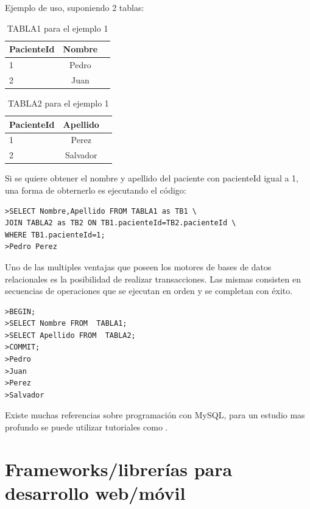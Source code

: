 Ejemplo de uso, suponiendo 2 tablas:

\begin{table}[h]
	\centering
	\caption[Tabla 1 Ejemplo SQL]{TABLA1 para el ejemplo 1}
	\begin{tabular}{l c c}    
		\toprule
		\textbf{PacienteId}     & \textbf{Nombre} \\
		\midrule
		 1& Pedro    \\		
 		 2& Juan    \\				
		\bottomrule
		\hline
	\end{tabular}
	\label{tab:Ejemplo 1}
\end{table}
\pagebreak
\begin{table}[h]
	\centering
	\caption[Tabla 2 Ejemplo SQL]{TABLA2 para el ejemplo 1}
	\begin{tabular}{l c c}    
		\toprule
		\textbf{PacienteId}     & \textbf{Apellido} \\
		\midrule
		 1& Perez    \\		
 		 2& Salvador    \\	
		\bottomrule
		\hline
	\end{tabular}
	\label{tab:Ejemplo 2}
\end{table}

Si se quiere obtener el nombre y apellido del paciente con pacienteId igual a 1, una forma de obternerlo es ejecutando el código:

\begin{lstlisting}[label=código:SQL:vControl,caption=Ejecución de comando sql]  
>SELECT Nombre,Apellido FROM TABLA1 as TB1 \
JOIN TABLA2 as TB2 ON TB1.pacienteId=TB2.pacienteId \
WHERE TB1.pacienteId=1;
>Pedro Perez
\end{lstlisting}

Uno de las multiples ventajas que poseen los motores de bases de datos relacionales es la posibilidad de realizar transacciones. Las mismas consisten en secuencias de operaciones que se ejecutan en orden y se completan con éxito.

\begin{lstlisting}[label=código:SQL2:vControl,caption=Secuencia de transacción sql]  
>BEGIN;
>SELECT Nombre FROM  TABLA1;
>SELECT Apellido FROM  TABLA2;
>COMMIT;
>Pedro 
>Juan
>Perez
>Salvador
\end{lstlisting}

Existe muchas referencias sobre programación con MySQL, para un estudio mas profundo se puede utilizar tutoriales como \citep{WEBSITE:13}.
\pagebreak
\section{Frameworks/librerías para desarrollo web/móvil}



